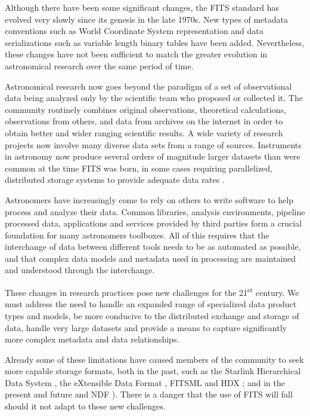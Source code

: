 \documentclass[final,authoryear,5p,times,twocolumn]{elsarticle}
\begin{document}
Although there have been some significant changes, the FITS standard
has evolved very slowly since its genesis in the late 1970s. New types
of metadata conventions such as World Coordinate System
\citep[WCS;][]{2002A&A...395.1061G,2002A&A...395.1077C,2006A&A...446..747G}
representation and data serializations such as variable length binary
tables \citep{1995A&AS..113..159C} have been added. Nevertheless,
these changes have not been sufficient to match the greater evolution
in astronomical research over the same period of time.


Astronomical research now goes beyond the paradigm of a set of
observational data being analyzed only by the scientific team who
proposed or collected it. The community routinely combines original
observations, theoretical calculations, observations from others, and
data from archives on the internet in order to obtain better and wider
ranging scientific results. A wide variety of research projects now involve many
diverse data sets from a range of sources. Instruments in astronomy
now produce several orders of magnitude larger datasets than were common
at the time FITS was born, in some cases requiring parallelized,
distributed storage systems to provide adequate data rates
\citep{2012ASPC..461..283A}.


Astronomers have increasingly come to rely on others to write software
to help process and analyze their data. Common libraries, analysis
environments, pipeline processed data, applications and services
provided by third parties form a crucial foundation for many
astronomers toolboxes. All of this requires that the interchange of
data between different tools needs to be as automated as possible, and
that complex data models and metadata used in processing are
maintained and understood through the interchange.


These changes in research practices pose new challenges for the
21\textsuperscript{st} century. We must address the need to handle an
expanded range of specialized data product types and models, be more
conducive to the distributed exchange and storage of data, handle very
large datasets and provide a means to capture significantly more complex
metadata and data relationships.


Already some of these limitations have caused members of the community
to seek more capable storage formats, both in the past, such as the
Starlink Hierarchical Data System \citep[HDS;][]{1982QJRAS..23..485D},
the eXtensible Data Format \citep[XDF;][]{2001ASPC..238..217S}, FITSML
\citep{2001ASPC..238..487T} and HDX \citep{2003ASPC..295..221G}; and
in the present and future
\citep[e.g. HDF5 ][]{2011ASPC..442...53A} and NDF \citep{P91_adassxxiii}).
There is a danger
that the use of FITS will fall should it not adapt to these new
challenges.
\end{document}
